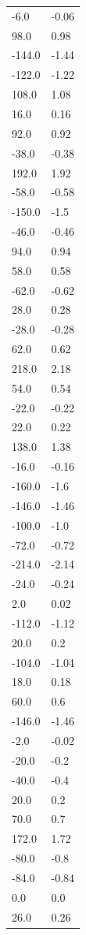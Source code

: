 \begin{longtable}{ll}
-6.0 & -0.06 \\
98.0 & 0.98 \\
-144.0 & -1.44 \\
-122.0 & -1.22 \\
108.0 & 1.08 \\
16.0 & 0.16 \\
92.0 & 0.92 \\
-38.0 & -0.38 \\
192.0 & 1.92 \\
-58.0 & -0.58 \\
-150.0 & -1.5 \\
-46.0 & -0.46 \\
94.0 & 0.94 \\
58.0 & 0.58 \\
-62.0 & -0.62 \\
28.0 & 0.28 \\
-28.0 & -0.28 \\
62.0 & 0.62 \\
218.0 & 2.18 \\
54.0 & 0.54 \\
-22.0 & -0.22 \\
22.0 & 0.22 \\
138.0 & 1.38 \\
-16.0 & -0.16 \\
-160.0 & -1.6 \\
-146.0 & -1.46 \\
-100.0 & -1.0 \\
-72.0 & -0.72 \\
-214.0 & -2.14 \\
-24.0 & -0.24 \\
2.0 & 0.02 \\
-112.0 & -1.12 \\
20.0 & 0.2 \\
-104.0 & -1.04 \\
18.0 & 0.18 \\
60.0 & 0.6 \\
-146.0 & -1.46 \\
-2.0 & -0.02 \\
-20.0 & -0.2 \\
-40.0 & -0.4 \\
20.0 & 0.2 \\
70.0 & 0.7 \\
172.0 & 1.72 \\
-80.0 & -0.8 \\
-84.0 & -0.84 \\
0.0 & 0.0 \\
26.0 & 0.26 \\

\end{longtable}
